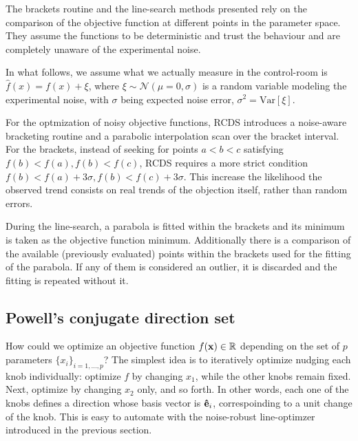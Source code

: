 The brackets routine and the line-search methods presented rely on the comparison of the objective function at different points in the parameter space. They assume the functions to be deterministic and trust the behaviour and are completely unaware of the experimental noise.

In what follows, we assume what we actually measure in the control-room is $\hat{f}(x)=f(x) + \xi$, where $\xi\sim\mathcal{N}(\mu=0, \sigma)$ is a random variable modeling the experimental noise, with $\sigma$ being expected noise error, $\sigma^2 = \text{Var}[\xi]$.

For the optmization of noisy objective functions, RCDS introduces a noise-aware bracketing routine and a parabolic interpolation scan over the bracket interval. For the brackets, instead of seeking for points $a<b<c$ satisfying $f(b)< f(a), f(b) < f(c)$, RCDS requires a more strict condition $f(b)< f(a)+3\sigma, f(b) < f(c)+3\sigma$. This increase the likelihood the observed trend consists on real trends of the objection itself, rather than random errors.

During the line-search, a parabola is fitted within the brackets and its minimum is taken as the objective function minimum. Additionally there is a comparison of the available (previously evaluated) points within the brackets used for the fitting of the parabola. If any of them is considered an outlier, it is discarded and the fitting is repeated without it.


\subsection{Powell's conjugate direction set}
How could we optimize an objective function $f(\vb{x})\in\mathbb{R}$ depending on the set of $p$ parameters $\{x_i\}_{i=1,\dots,p}$? The simplest idea is to iteratively optimize nudging each knob individually: optimize $f$ by changing $x_1$, while the other knobs remain fixed. Next, optimize by changing $x_2$ only, and so forth. In other words, each one of the knobs defines a direction whose basis vector is $\vu{e}_i$, correspoinding to a unit change of the knob. This is easy to automate with the noise-robust line-optimzer introduced in the previous section.

